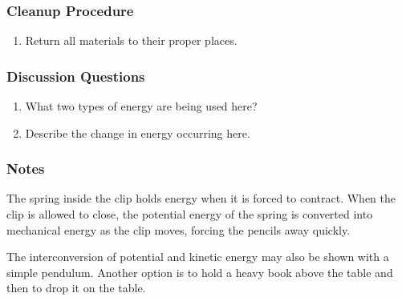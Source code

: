 \subsubsection*{Cleanup Procedure}
\begin{enumerate}
\item{Return all materials to their proper places.}
\end{enumerate}

\subsubsection*{Discussion Questions}
\begin{enumerate}
\item{What two types of energy are being used here?}
\item{Describe the change in energy occurring here.}
\end{enumerate}
 
\subsubsection{Notes}
The spring inside the clip holds energy when it is forced to contract.  
When the clip is allowed to close, the potential energy of the spring
is converted into mechanical energy as the clip moves, forcing the pencils
away quickly.

The interconversion of potential and kinetic energy may also be shown with a simple pendulum. Another option is to hold a heavy book above the table and then to drop it on the table.
